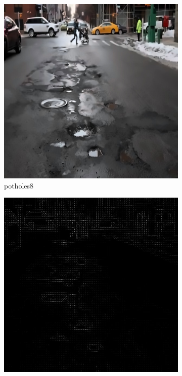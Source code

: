 \documentclass[a4paper, 10pt]{article}
\begin{document}
\begin{figure}[htbp]
		\begin{subfigure}{0.24\textwidth}
			\includegraphics[width=\linewidth]{picture/alldata/potholes8}
			\caption{potholes8}
			\label{fig: potholes8}	
		\end{subfigure}
		\begin{subfigure}{0.24\textwidth}
			\includegraphics[width=\linewidth]{picture/alldata_hog/potholes8}

\end{subfigure}
\end{figure}
\end{document}

